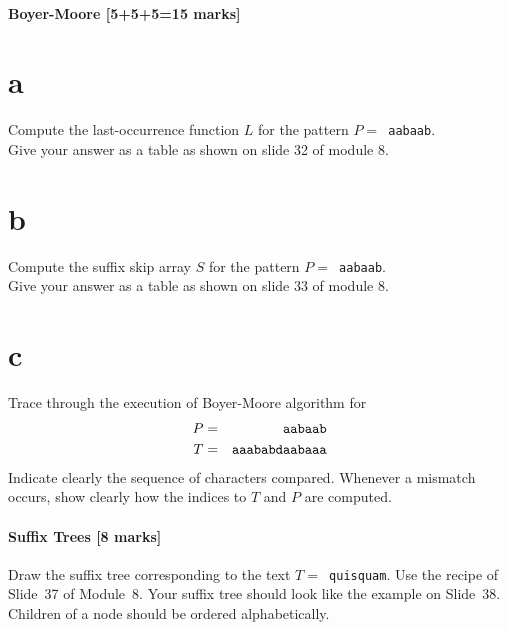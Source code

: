 \documentclass[12pt]{article}
\begin{document}
\subsection{Boyer-Moore [5+5+5=15 marks]}
\begin{itemize}
\part{a}
Compute the last-occurrence function $L$ for the pattern $P =$\texttt{~aabaab}.\\ Give your answer as a table as shown on slide 32 of module 8.
\part{b}
Compute the suffix skip array $S$ for the pattern $P =$\texttt{~aabaab}. \\Give your answer as a table as shown on slide 33 of module 8.
\part{c} Trace through the execution of Boyer-Moore algorithm for 
\begin{align*}
P &=& \tt{aabaab}\\
T &=& \tt{aaababdaabaaa}
\end{align*}
Indicate clearly the sequence of characters compared. Whenever a mismatch occurs, show clearly how the indices to $T$ and $P$ are computed.
\end{itemize}

\subsection{Suffix Trees [8 marks]} 
Draw the suffix tree corresponding to the text
$T =$\verb[ quisquam[.  Use the recipe of Slide~37 of Module~8.
Your suffix tree should look like the example on Slide~38.
Children of a node should be ordered alphabetically.

\end{document}
